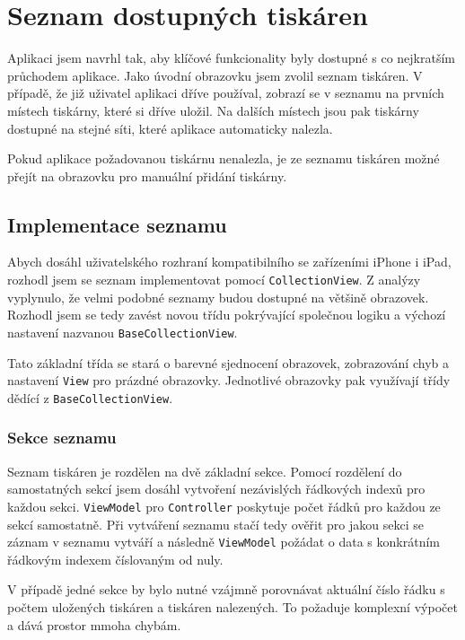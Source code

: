 \section{Seznam dostupných tiskáren}

Aplikaci jsem navrhl tak, aby klíčové funkcionality byly dostupné s co nejkratším průchodem aplikace.
Jako úvodní obrazovku jsem zvolil seznam tiskáren.
V případě, že již uživatel aplikaci dříve používal, zobrazí se v seznamu na prvních místech tiskárny, které si dříve uložil.
Na dalších místech jsou pak tiskárny dostupné na stejné síti, které aplikace automaticky nalezla.

Pokud aplikace požadovanou tiskárnu nenalezla, je ze seznamu tiskáren možné přejít na obrazovku pro manuální přidání tiskárny.

\subsection{Implementace seznamu}

Abych dosáhl uživatelského rozhraní kompatibilního se zařízeními iPhone i iPad, rozhodl jsem se seznam implementovat pomocí \texttt{CollectionView}.
Z analýzy vyplynulo, že velmi podobné seznamy budou dostupné na většině obrazovek.
Rozhodl jsem se tedy zavést novou třídu pokrývající společnou logiku a výchozí nastavení nazvanou \texttt{BaseCollectionView}.

Tato základní třída se stará o barevné sjednocení obrazovek, zobrazování chyb a nastavení \texttt{View} pro prázdné obrazovky.
Jednotlivé obrazovky pak využívají třídy dědící z \texttt{BaseCollectionView}.

\subsubsection*{Sekce seznamu}

Seznam tiskáren je rozdělen na dvě základní sekce.
Pomocí rozdělení do samostatných sekcí jsem dosáhl vytvoření nezávislých řádkových indexů pro každou sekci.
\texttt{ViewModel} pro \texttt{Controller} poskytuje počet řádků pro každou ze sekcí samostatně.
Při vytváření seznamu stačí tedy ověřit pro jakou sekci se záznam v seznamu vytváří a následně \texttt{ViewModel} požádat o data s konkrátním řádkovým indexem číslovaným od nuly.

V případě jedné sekce by bylo nutné vzájmně porovnávat aktuální číslo řádku s počtem uložených tiskáren a tiskáren nalezených.
To požaduje komplexní výpočet a dává prostor mmoha chybám.

